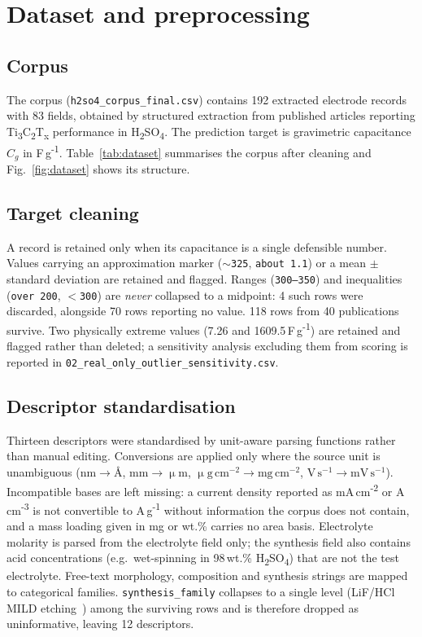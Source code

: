\section{Dataset and preprocessing}\label{sec:data}

\subsection{Corpus}
The corpus (\texttt{h2so4\_corpus\_final.csv}) contains 192 extracted electrode
records with 83 fields, obtained by structured extraction from published articles reporting
Ti\textsubscript{3}C\textsubscript{2}T\textsubscript{x} performance in
H\textsubscript{2}SO\textsubscript{4}. The prediction target is gravimetric capacitance
$C_g$ in F\,g\textsuperscript{-1}. Table~\ref{tab:dataset} summarises the corpus after
cleaning and Fig.~\ref{fig:dataset} shows its structure.

\subsection{Target cleaning}
A record is retained only when its capacitance is a single defensible number. Values
carrying an approximation marker (\texttt{$\sim$325}, \texttt{about 1.1}) or a mean
$\pm$ standard deviation are retained and flagged. Ranges (\texttt{300--350}) and
inequalities (\texttt{over 200}, \texttt{$<$300}) are \emph{never} collapsed to a
midpoint: 4 such rows were discarded, alongside
70 rows reporting no value.
118 rows from 40 publications survive. Two physically extreme values
(7.26 and 1609.5\,F\,g\textsuperscript{-1})
are retained and flagged rather than deleted; a sensitivity analysis excluding them from
scoring is reported in \texttt{02\_real\_only\_outlier\_sensitivity.csv}.

\subsection{Descriptor standardisation}
Thirteen descriptors were standardised by unit-aware parsing functions rather than manual
editing. Conversions are applied only where the source unit is unambiguous
($\mathrm{nm}\rightarrow\text{\AA}$, $\mathrm{mm}\rightarrow\upmu\mathrm{m}$,
$\upmu\mathrm{g\,cm^{-2}}\rightarrow\mathrm{mg\,cm^{-2}}$,
$\mathrm{V\,s^{-1}}\rightarrow\mathrm{mV\,s^{-1}}$). Incompatible bases are left
missing: a current density reported as mA\,cm\textsuperscript{-2} or
A\,cm\textsuperscript{-3} is not convertible to A\,g\textsuperscript{-1} without
information the corpus does not contain, and a mass loading given in mg or wt.\% carries no
area basis. Electrolyte molarity is parsed from the electrolyte field only; the synthesis
field also contains acid concentrations (e.g.\ wet-spinning in 98\,wt.\%
H\textsubscript{2}SO\textsubscript{4}) that are not the test electrolyte. Free-text
morphology, composition and synthesis strings are mapped to categorical families.
\texttt{synthesis\_family} collapses to a single level (LiF/HCl MILD etching~\cite{alhabeb2017}) among
the surviving rows and is therefore dropped as uninformative, leaving 12 descriptors.

